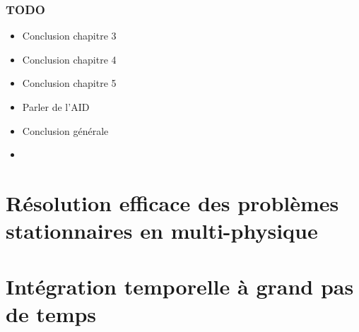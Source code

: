 



\makeflyleaf
{}

\tableofcontents
{}



\section*{TODO}
\begin{itemize}
  \item Conclusion chapitre 3
  \item Conclusion chapitre 4
  \item Conclusion chapitre 5
  \item Parler de l'AID
  \item Conclusion générale
  \item {}
\end{itemize}


\part{Résolution efficace des problèmes stationnaires en multi-physique}

  

  

  

\part{Intégration temporelle à grand pas de temps}

    

    





